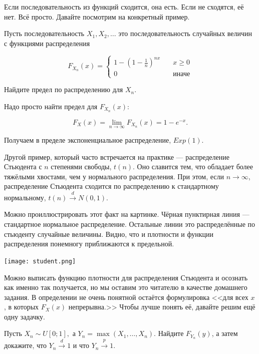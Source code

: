 \documentclass[12pt, a4paper, oneside]{article}
\begin{document}
Если последовательность из функций сходится, она есть. Если не сходятся, её нет. Всё просто. Давайте посмотрим на конкретный пример. 

\begin{problem}{ } 
Пусть последовательность $X_1, X_2, \ldots $ это последовательность случайных величин с функциями распределения 

$$
F_{X_n}(x) = \begin{cases} 1 - \left(1 - \frac{1}{n} \right)^{nx} \quad& x \ge 0 \\ 0 \quad & \text{иначе} \end{cases}
$$

Найдите предел по распределению для $X_n$. 
\end{problem} 

\begin{sol}
Надо просто найти предел для $F_{X_n}(x)$: 

$$
F_X(x) = \lim_{n \to \infty} F_{X_n}(x) = 1 - e^{-x}.
$$

Получаем в пределе экспоненциальное распределение, $Exp(1)$. 
\end{sol}

Другой пример, который часто встречается на практике --- распределение Стьюдента с $n$ степенями свободы, $t(n)$. Оно славится тем, что обладает более тяжёлыми хвостами, чем у нормального распределения. При этом, если $n \to \infty$, распределение Стьюдента сходится по распределению к стандартному нормальному, $t(n) \overset{d}{\to} N(0,1).$ 

Можно проиллюстрировать этот факт на картинке. Чёрная пунктирная линия --- стандартное нормальное распределение. Остальные линии это распределённые по стьюденту случайные величины. Видно, что и плотности и функции распределения понемногу приближаются к предельной. 

\begin{center} 
\texttt{[image: student.png]}
\end{center} 

Можно выписать функцию плотности для распределения Стьюдента и осознать как именно так получается, но мы оставим это читателю в качестве домашнего задания. В определении не очень понятной остаётся формулировка <<для всех $x$, в которых $F_X(x)$ непрерывна.>> Чтобы лучше понять её, давайте решим ещё одну задачку.

\begin{problem}{ } 
Пусть $X_n \sim U[0;1],$ а $Y_n = \max(X_1, \ldots, X_n).$ Найдите $F_{Y_n}(y)$, а затем докажите, что $Y_n \overset{d}{\to} 1$ и что  $Y_n \overset{p}{\to} 1.$
\end{problem} 
\end{document}

